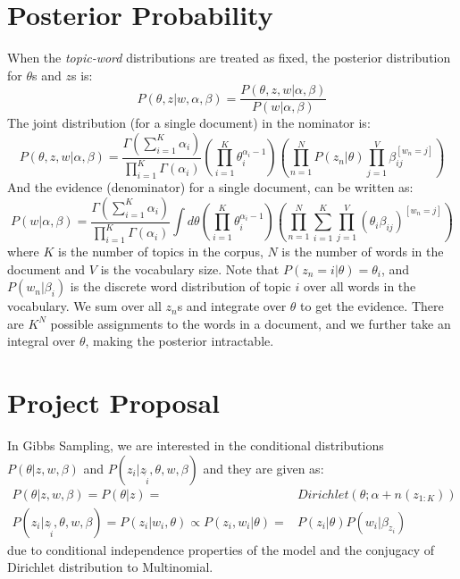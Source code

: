 \documentclass{article}%
\begin{document}
\section{Posterior Probability}
When the \textit{topic-word} distributions are treated as fixed, the posterior distribution for $\theta$s and $z$s is:
\begin{equation}
P(\theta, z|w, \alpha, \beta) = \frac{P(\theta, z, w|\alpha, \beta)}{P(w|\alpha, \beta)}
\end{equation}
The joint distribution (for a single document) in the nominator is:
\begin{equation}
P(\theta, z, w|\alpha, \beta) = \frac{\Gamma(\sum_{i=1}^K \alpha_i)}{\prod_{i=1}^K\Gamma(\alpha_i)} \left(\prod_{i=1}^K \theta_i^{\alpha_i -1} \right) \left(\prod_{n=1}^N P(z_n|\theta)\prod_{j=1}^V\beta_{ij}^{[w_n = j]}\right)
\end{equation}
And the evidence (denominator) for a single document, can be written as:
\begin{equation}
P(w|\alpha, \beta) = \frac{\Gamma(\sum_{i=1}^K \alpha_i)}{\prod_{i=1}^K\Gamma(\alpha_i)} \int d\theta \left(\prod_{i=1}^K \theta_i^{\alpha_i -1} \right) \left(\prod_{n=1}^N\sum_{i=1}^K\prod_{j=1}^V(\theta_i\beta_{ij})^{[w_n = j]}\right)
\end{equation}
where $K$ is the number of topics in the corpus, $N$ is the number of words in the document and $V$ is the vocabulary size. Note that $P(z_n=i|\theta) = \theta_i$, and $P(w_n|\beta_i)$ is the discrete word distribution of topic $i$ over all words in the vocabulary.  We sum over all $z_n$s and integrate over $\theta$ to get the evidence. There are $K^N$ possible assignments to the words in a document, and we further take an integral over $\theta$, making the posterior intractable.

\section{Project Proposal}
In Gibbs Sampling, we are interested in the conditional distributions $P(\theta|z, w, \beta)$ and  $P(z_i|z_{\not{i}}, \theta, w, \beta)$ and they are given as:
\begin{align*}
P(\theta|z, w, \beta) = P(\theta|z) = & Dirichlet(\theta; \alpha + n(z_{1:K}))\\
P(z_i|z_{\not{i}}, \theta, w, \beta) = P(z_i|w_i, \theta) \propto P(z_i, w_i| \theta) =& P(z_i|\theta) P(w_i|\beta_{z_i})
\end{align*}
due to conditional independence properties of the model and the conjugacy of Dirichlet distribution to Multinomial. 
\end{document}

